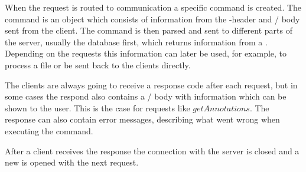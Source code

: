 When the request is routed to communication a specific command is
created. The command is an object which consists of information from
the -header and \json/ body sent from the
client. The command is then parsed and sent to different parts of the
server, usually the database first, which returns information from a
. Depending on the requests this information can later
be used, for example, to process a file or be sent back to the clients
directly.

The clients are always going to receive a response code after each
request, but in some cases the respond also contains a \json/
body with information which can be shown to the user. This is the case
for requests like $getAnnotations$. The response can also contain
error messages, describing what went wrong when executing the command.

After a client receives the response the connection with the server is
closed and a new is opened with the next request.
